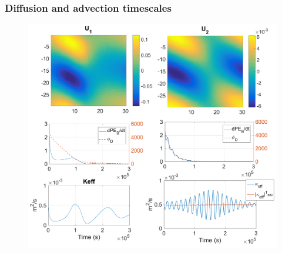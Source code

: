 \subsubsection{Diffusion and advection timescales}
\begin{figure}[h!]
\centering
\includegraphics[width=1\textwidth]{./CHAP_BPE/Fig_numlab_advdiff3.png}
\caption{ }
\label{fig4numlab}
\end{figure}

